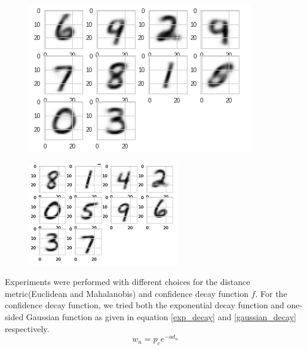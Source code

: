 \documentclass[runningheads]{llncs}
\begin{document}
\begin{figure}
\centering
\begin{minipage}{.5\textwidth}
  \centering
  \includegraphics[width=.9\linewidth]{cluster_centers_epoch_1_0_gmm.png} \\
  \label{cluster_center_1}
\end{minipage}%
\begin{minipage}{.5\textwidth}
  \centering
  \includegraphics[width=.9\linewidth]{cluster_centers_epoch_5_0_gmm.png} \\
  \label{cluster_center_5}
\end{minipage}
\end{figure}

Experiments were performed with different choices for the distance metric(Euclidean and Mahalanobis) and confidence decay function $f$.
For the confidence decay function, we tried both the exponential decay function and one-sided Gaussian function as given in equation \ref{exp_decay} and \ref{gaussian_decay} respectively.
\begin{equation}
    w_n = p_ce^{-a d_n}
    \label{exp_decay}
\end{equation}
\end{document}
